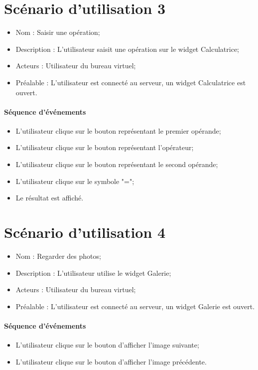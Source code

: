 {\color{red}
\section{Scénario d'utilisation 3}
\begin{itemize}
	\item Nom : Saisir une opération;
	\item Description : L'utilisateur saisit une opération sur le widget Calculatrice;
	\item Acteurs : Utilisateur du bureau virtuel;
	\item Préalable : L'utilisateur est connecté au serveur, un widget Calculatrice est ouvert.
\end{itemize}

\paragraph{Séquence d'événements}
\begin{itemize}
	\item L'utilisateur clique sur le bouton représentant le premier opérande;
	\item L'utilisateur clique sur le bouton représentant l'opérateur;
	\item L'utilisateur clique sur le bouton représentant le second opérande;
	\item L'utilisateur clique sur le symbole "=";
	\item Le résultat est affiché.
\end{itemize}
}


\section{Scénario d'utilisation 4}
\begin{itemize}
	\item Nom : Regarder des photos;
	\item Description : L'utilisateur utilise le widget Galerie;
	\item Acteurs : Utilisateur du bureau virtuel;
	\item Préalable : L'utilisateur est connecté au serveur, un widget Galerie est ouvert.
\end{itemize}

\paragraph{Séquence d'événements}
\begin{itemize}
	\item L'utilisateur clique sur le bouton d'afficher l'image suivante;
	\item L'utilisateur clique sur le bouton d'afficher l'image précédente.
\end{itemize}


